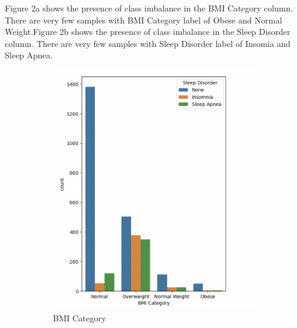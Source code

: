 \documentclass[10pt,twocolumn,letterpaper]{article}
\begin{document}
Figure 2a shows the presence of class imbalance in the BMI Category column. There are very few samples with BMI Category label of Obese and Normal Weight.Figure 2b shows the presence of class imbalance in the Sleep Disorder column. There are very few samples with Sleep Disorder label of Insomia and Sleep Apnea.
\begin{figure}[H]
   \begin{subfigure}{.3\textwidth}
  
  \includegraphics[width=.8\linewidth]{relationplot1.png}
  \caption{BMI Category}
  \label{fig:sub1}
\end{subfigure}%
\begin{subfigure}{.3\textwidth}
  

\end{subfigure}
\end{figure}
\end{document}
